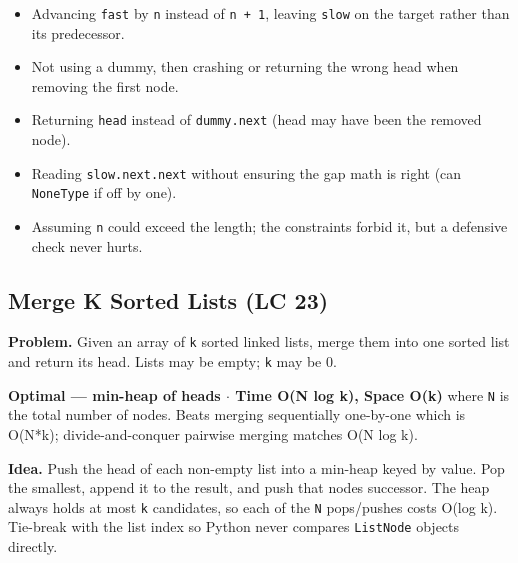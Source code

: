 \documentclass[11pt]{article}
\providecommand{\tightlist}{\setlength{\itemsep}{1pt}\setlength{\parskip}{0pt}}
\begin{document}
\begin{itemize}
\tightlist
\item
  Advancing \texttt{fast} by \texttt{n} instead of \texttt{n\ +\ 1}, leaving \texttt{slow} on the target rather than its predecessor.
\item
  Not using a dummy, then crashing or returning the wrong head when removing the first node.
\item
  Returning \texttt{head} instead of \texttt{dummy.next} (head may have been the removed node).
\item
  Reading \texttt{slow.next.next} without ensuring the gap math is right (can \texttt{NoneType} if off by one).
\item
  Assuming \texttt{n} could exceed the length; the constraints forbid it, but a defensive check never hurts.
\end{itemize}

\subsection{Merge K Sorted Lists (LC 23)}\label{merge-k-sorted-lists-lc-23}

\textbf{Problem.} Given an array of \texttt{k} sorted linked lists, merge them into one sorted list and return its head. Lists may be empty; \texttt{k} may be 0.

\textbf{Optimal --- min-heap of heads \(\cdot\) Time O(N log k), Space O(k)} where \texttt{N} is the total number of nodes. Beats merging sequentially one-by-one which is O(N*k); divide-and-conquer pairwise merging matches O(N log k).

\textbf{Idea.} Push the head of each non-empty list into a min-heap keyed by value. Pop the smallest, append it to the result, and push that node\textquotesingle s successor. The heap always holds at most \texttt{k} candidates, so each of the \texttt{N} pops/pushes costs O(log k). Tie-break with the list index so Python never compares \texttt{ListNode} objects directly.

\end{document}
